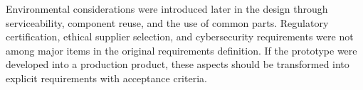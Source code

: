 Environmental considerations were introduced later in the design through
serviceability, component reuse, and the use of common parts. Regulatory certification, ethical supplier selection, and cybersecurity requirements were not among major items in the original requirements
definition. If the prototype were developed into a production product, these aspects should be transformed into explicit requirements with acceptance criteria.
